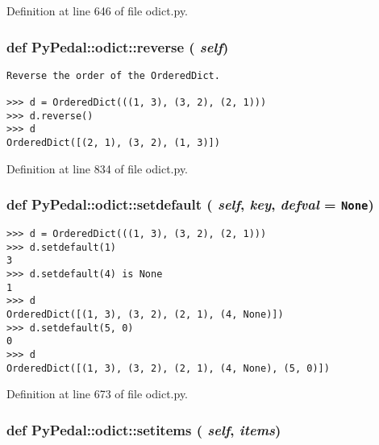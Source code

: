 Definition at line 646 of file odict.py.\hypertarget{namespacePyPedal_1_1odict_b801b24829bb4213cb873e99e3547b68}{
\subsubsection{\setlength{\rightskip}{0pt plus 5cm}def PyPedal::odict::reverse ( {\em self})}}
\label{namespacePyPedal_1_1odict_b801b24829bb4213cb873e99e3547b68}




\footnotesize\begin{verbatim}
Reverse the order of the OrderedDict.

>>> d = OrderedDict(((1, 3), (3, 2), (2, 1)))
>>> d.reverse()
>>> d
OrderedDict([(2, 1), (3, 2), (1, 3)])
\end{verbatim}
\normalsize
 

Definition at line 834 of file odict.py.\hypertarget{namespacePyPedal_1_1odict_ef59d4909ce7f0e1e0e27cf17f1744cb}{
\subsubsection{\setlength{\rightskip}{0pt plus 5cm}def PyPedal::odict::setdefault ( {\em self},  {\em key},  {\em defval} = {\tt None})}}
\label{namespacePyPedal_1_1odict_ef59d4909ce7f0e1e0e27cf17f1744cb}




\footnotesize\begin{verbatim}
>>> d = OrderedDict(((1, 3), (3, 2), (2, 1)))
>>> d.setdefault(1)
3
>>> d.setdefault(4) is None
1
>>> d
OrderedDict([(1, 3), (3, 2), (2, 1), (4, None)])
>>> d.setdefault(5, 0)
0
>>> d
OrderedDict([(1, 3), (3, 2), (2, 1), (4, None), (5, 0)])
\end{verbatim}
\normalsize
 

Definition at line 673 of file odict.py.\hypertarget{namespacePyPedal_1_1odict_57dbf330d4a4fbfcbcc68650c84b4f01}{
\subsubsection{\setlength{\rightskip}{0pt plus 5cm}def PyPedal::odict::setitems ( {\em self},  {\em items})}}
\label{namespacePyPedal_1_1odict_57dbf330d4a4fbfcbcc68650c84b4f01}




